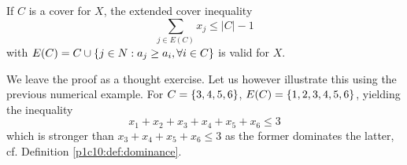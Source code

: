 \begin{proposition}
	If $C$ is a cover for $X$, the extended cover inequality
	\begin{equation*}
		\sum_{j \in E(C)} x_j \leq |C|-1
	\end{equation*}
	with $E(C) = C \cup \left\{ j\in N: a_j \geq a_i, \forall i \in C \right \}$ is valid for $X$.
\end{proposition}

We leave the proof as a thought exercise. Let us however illustrate this using the previous numerical example. For $C = \left\{ 3,4,5,6 \right \}$, $E(C) = \left\{ 1,2,3,4,5,6 \right \}$, yielding the inequality 
%
\begin{equation*}
	x_1 + x_2 + x_3 + x_4 + x_5 + x_6 \leq 3	
\end{equation*}
%
which is stronger than $x_3 + x_4 + x_5 + x_6 \leq 3$ as the former dominates the latter, cf. Definition \ref{p1c10:def:dominance}. 



